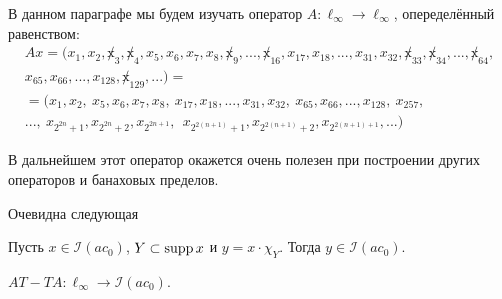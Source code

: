 В данном параграфе мы будем изучать оператор $A:\ell_\infty\to\ell_\infty$,
опеределённый равенством:
\begin{multline}
	\label{eq:oper_A_throws_out_2power_blocks}
	Ax = (x_1, x_2, \not x_3, \not x_4, x_5, x_6, x_7, x_8, \not x_9, ..., \not x_{16}, x_{17}, x_{18}, ..., x_{31}, x_{32}, \not x_{33}, \not x_{34}, ..., \not x_{64},
	\\
	x_{65}, x_{66}, ..., x_{128}, \not x_{129}, ...)=
	\\=
	(x_1, x_2, \ x_5, x_6, x_7, x_8, \ x_{17}, x_{18}, ..., x_{31}, x_{32}, \ x_{65}, x_{66}, ..., x_{128}, \ x_{257},
	\\
	..., \ x_{2^{2n} +1}, x_{2^{2n} +2},  x_{2^{2n+1}}, \ \ x_{2^{2(n+1)} +1},  x_{2^{2(n+1)} +2},  x_{2^{2(n+1)+1}}, ...)
\end{multline}

В дальнейшем этот оператор окажется очень полезен при построении других операторов и банаховых пределов.

Очевидна следующая

\begin{lemma}
	\label{lem:supp_I_ac0}
	Пусть $x\in \mathcal I(ac_0)$, $Y \subset \operatorname{supp} x$ и $y = x \cdot \chi_Y$.
	Тогда $y \in \mathcal I(ac_0)$.
\end{lemma}


\begin{lemma}
	\label{lem:AT-TA}
	$AT - TA: \ell_\infty \to \mathcal{I}(ac_0)$.
\end{lemma}

